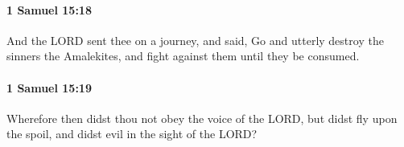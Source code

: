 		\paragraph{1 Samuel 15:18} %
			\label{1SAMUEL-15-18}

			And the LORD sent thee on a journey, and said, Go and utterly destroy the sinners the Amalekites, and fight against them until they be consumed.


		\paragraph{1 Samuel 15:19} %
			\label{1SAMUEL-15-19}

			Wherefore then didst thou not obey the voice of the LORD, but didst fly upon the spoil, and didst evil in the sight of the LORD?



